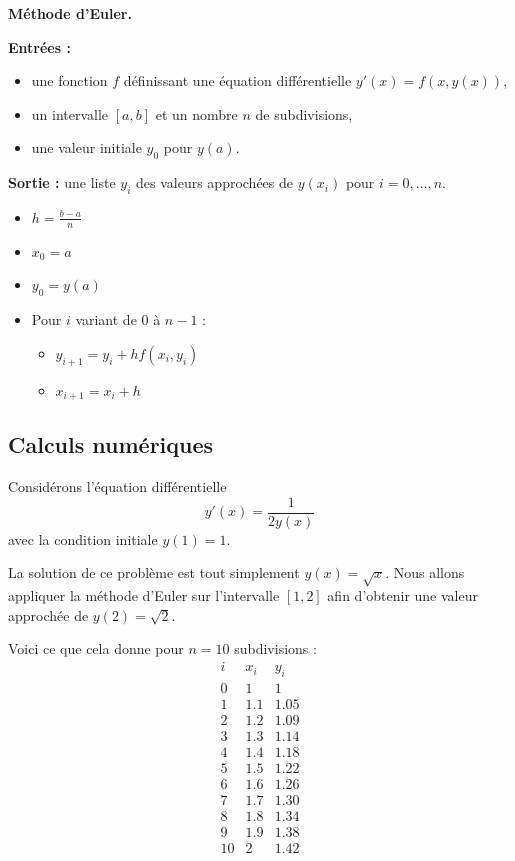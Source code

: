\documentclass[11pt,class=report,crop=false]{standalone}
\begin{document}
\begin{algorithme}
\textbf{Méthode d'Euler.}

\textbf{Entrées :} 
    \begin{itemize}
        \item une fonction $f$ définissant une équation différentielle $y'(x) = f(x, y(x))$,
        \item un intervalle $[a,b]$ et un nombre $n$ de subdivisions,
        \item une valeur initiale $y_0$ pour $y(a)$.
    \end{itemize}

\textbf{Sortie :} une liste $y_i$ des valeurs approchées de $y(x_i)$ pour $i=0,\ldots,n$.

\begin{itemize}
    \item $h = \frac{b-a}{n}$
    \item $x_0 = a$
    \item $y_0 = y(a)$
    \item Pour $i$ variant de $0$ à $n-1$ :
    \begin{itemize}
        \item $y_{i+1} = y_i + h  f(x_i, y_i)$
        \item $x_{i+1} = x_i + h$
    \end{itemize}
\end{itemize}
\end{algorithme}

\subsection{Calculs numériques}

Considérons l'équation différentielle 
$$y'(x) = \frac{1}{2y(x)}$$
avec la condition initiale $y(1) = 1$.

La solution de ce problème est tout simplement $y(x) = \sqrt{x}$.
Nous allons appliquer la méthode d'Euler sur l'intervalle $[1,2]$ afin d'obtenir une valeur approchée de $y(2)=\sqrt{2}$.

Voici ce que cela donne pour $n=10$ subdivisions :
$$
\begin{array}{c|c|c}
i & x_i & y_i \\
\hline
0 & 1   & 1 \\
1 & 1.1 & 1.05 \\
2 & 1.2 & 1.09 \\
3 & 1.3 & 1.14 \\
4 & 1.4 & 1.18 \\
5 & 1.5 & 1.22 \\
6 & 1.6 & 1.26 \\
7 & 1.7 & 1.30 \\
8 & 1.8 & 1.34 \\
9 & 1.9 & 1.38 \\
10 & 2  & 1.42 \\    
\end{array}$$
\end{document}
